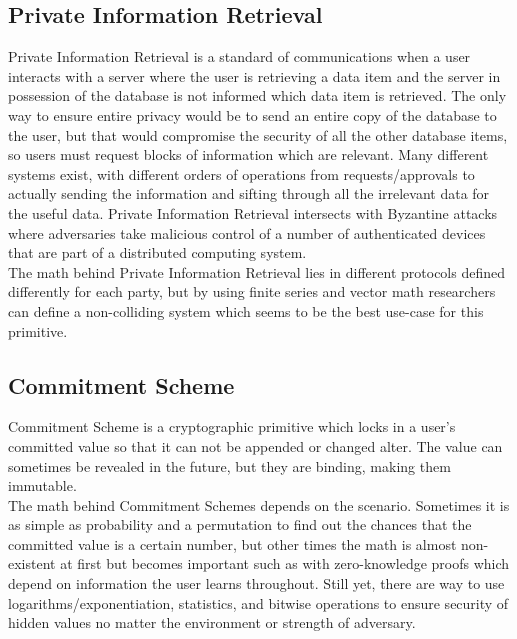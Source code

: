 \documentclass[12pt]{extarticle}
\begin{document}
\subsection{Private Information Retrieval}
Private Information Retrieval is a standard of communications when a user interacts with a server where the user is retrieving a data item and the server in possession of the database is not informed which data item is retrieved. The only way to ensure entire privacy would be to send an entire copy of the database to the user, but that would compromise the security of all the other database items, so users must request blocks of information which are relevant. Many different systems exist, with different orders of operations from requests/approvals to actually sending the information and sifting through all the irrelevant data for the useful data. Private Information Retrieval intersects with Byzantine attacks where adversaries take malicious control of a number of authenticated devices that are part of a distributed computing system.\cite{src7}\\
The math behind Private Information Retrieval lies in different protocols defined differently for each party, but by using finite series and vector math researchers can define a non-colliding system which seems to be the best use-case for this primitive.
\subsection{Commitment Scheme}
Commitment Scheme is a cryptographic primitive which locks in a user's committed value so that it can not be appended or changed alter. The value can sometimes be revealed in the future, but they are binding, making them immutable.\cite{src7}\\
The math behind Commitment Schemes depends on the scenario. Sometimes it is as simple as probability and a permutation to find out the chances that the committed value is a certain number, but other times the math is almost non-existent at first but becomes important such as with zero-knowledge proofs which depend on information the user learns throughout. Still yet, there are way to use logarithms/exponentiation, statistics, and bitwise operations to ensure security of hidden values no matter the environment or strength of adversary.
\end{document}
